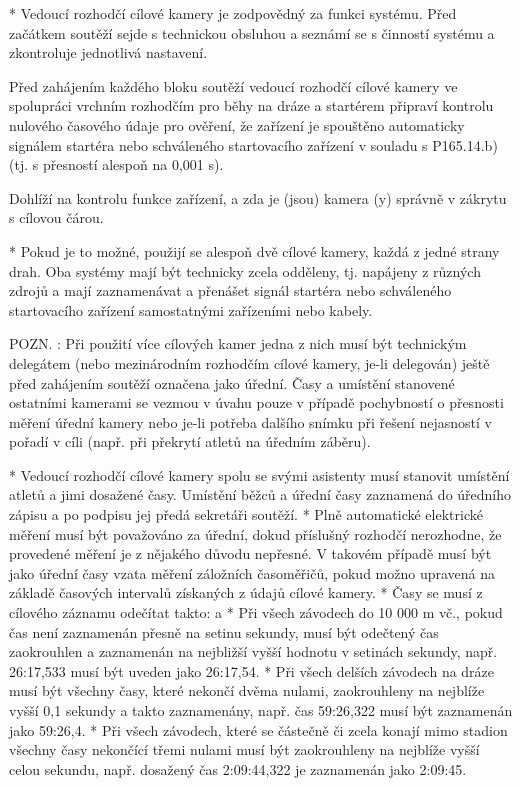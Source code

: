 * Vedoucí rozhodčí cílové kamery je zodpovědný za funkci systému. Před začátkem soutěží sejde s technickou obsluhou a seznámí se s činností systému a zkontroluje jednotlivá nastavení.

Před zahájením každého bloku soutěží vedoucí rozhodčí cílové kamery ve spolupráci vrchním rozhodčím pro běhy na dráze a startérem připraví kontrolu nulového časového údaje pro ověření, že zařízení je spouštěno automaticky signálem startéra nebo schváleného startovacího zařízení v souladu s P165.14.b) (tj. s přesností alespoň na 0,001 s).

Dohlíží na kontrolu funkce zařízení, a zda je (jsou) kamera (y) správně v zákrytu s cílovou čárou.

* Pokud je to možné, použijí se alespoň dvě cílové kamery, každá z jedné strany drah. Oba systémy mají být technicky zcela odděleny, tj. napájeny z různých zdrojů a mají zaznamenávat a přenášet signál startéra nebo schváleného startovacího zařízení samostatnými zařízeními nebo kabely.

POZN. : Při použití více cílových kamer jedna z nich musí být technickým delegátem (nebo mezinárodním rozhodčím cílové kamery, je-li delegován) ještě před zahájením soutěží označena jako úřední. Časy a umístění stanovené ostatními kamerami se vezmou v úvahu pouze v případě pochybností o přesnosti měření úřední kamery nebo je-li potřeba dalšího snímku při řešení nejasností v pořadí v cíli (např. při překrytí atletů na úředním záběru).

* Vedoucí rozhodčí cílové kamery spolu se svými asistenty musí stanovit umístění atletů a jimi dosažené časy. Umístění běžců a úřední časy zaznamená do úředního zápisu a po podpisu jej předá sekretáři soutěží.
* Plně automatické elektrické měření musí být považováno za úřední, dokud příslušný rozhodčí nerozhodne, že provedené měření je z nějakého důvodu nepřesné. V takovém případě musí být jako úřední časy vzata měření záložních časoměřičů, pokud možno upravená na základě časových intervalů získaných z údajů cílové kamery.
* Časy se musí z cílového záznamu odečítat takto:
  \begitems \style a
  * Při všech závodech do 10 000 m vč., pokud čas není zaznamenán přesně na setinu sekundy, musí být odečtený čas zaokrouhlen a zaznamenán na nejbližší vyšší hodnotu v setinách sekundy, např. 26:17,533 musí být uveden jako 26:17,54.
  * Při všech delších závodech na dráze musí být všechny časy, které nekončí dvěma nulami, zaokrouhleny na nejblíže vyšší 0,1 sekundy a takto zaznamenány, např. čas 59:26,322 musí být zaznamenán jako 59:26,4.
  * Při všech závodech, které se částečně či zcela konají mimo stadion všechny časy nekončící třemi nulami musí být zaokrouhleny na nejblíže vyšší celou sekundu, např. dosažený čas 2:09:44,322 je zaznamenán jako 2:09:45.
  \enditems

